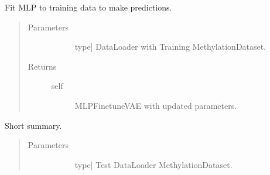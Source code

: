 \documentclass[letterpaper,10pt,english]{sphinxmanual}
\begin{document}
\begin{fulllineitems}
\begin{fulllineitems}
\begin{quote}
\begin{description}
\begin{description}
\end{description}

\end{description}\end{quote}

\end{fulllineitems}


\begin{fulllineitems}
\label{\detokenize{index:methylnet.models.MLPFinetuneVAE.fit}}
Fit MLP to training data to make predictions.
\begin{quote}\begin{description}
\item[{Parameters}] \leavevmode\begin{description}
\item[{}] \leavevmode{[}type{]}
DataLoader with Training MethylationDataset.

\end{description}

\item[{Returns}] \leavevmode\begin{description}
\item[{self}] \leavevmode
MLPFinetuneVAE with updated parameters.

\end{description}

\end{description}\end{quote}

\end{fulllineitems}


\begin{fulllineitems}
\label{\detokenize{index:methylnet.models.MLPFinetuneVAE.predict}}
Short summary.
\begin{quote}\begin{description}
\item[{Parameters}] \leavevmode\begin{description}
\item[{}] \leavevmode{[}type{]}
Test DataLoader MethylationDataset.


\end{description}
\end{description}
\end{quote}
\end{fulllineitems}
\end{fulllineitems}
\end{document}
